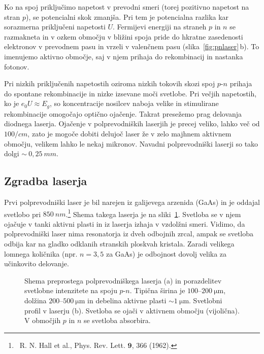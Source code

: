 Ko na spoj priključimo napetost v prevodni smeri (torej pozitivno napetost na stran
$p$), se potencialni skok zmanjša. Pri tem je potencialna razlika kar sorazmerna priključeni
napetosti $U$. Fermijevi energiji na straneh $p$ in $n$ se razmakneta in v
ozkem območju v bližini spoja pride do hkratne zasedenosti elektronov
v prevodnem pasu in vrzeli v valenčnem pasu (slika~\ref{fig:pnlaser}\,b). 
To imenujemo aktivno območje, saj v njem prihaja do rekombinacij in
nastanka fotonov. 

Pri nizkih 
priključenih napetostih oziroma nizkih tokovih skozi spoj $p$-$n$ prihaja
do spontane rekombinacije in nizke izsevane moči svetlobe. 
Pri večjih napetostih, ko je $e_0U \approx E_g$, so koncentracije nosilcev naboja velike in
stimulirane rekombinacije omogočajo optično ojačenje. Takrat presežemo prag delovanja
diodnega laserja. 
Ojačenje v polprevodniških laserjih je precej veliko, lahko več od 
$100/\si{cm}$, zato je mogoče dobiti delujoč laser že v zelo majhnem aktivnem 
območju, velikem lahko le nekaj mikronov. Navadni polprevodniški laserji so tako 
dolgi $\sim~0,25~\si{mm}$.
\newpage

\subsection*{Zgradba laserja}
Prvi polprevodniški laser je bil narejen iz galijevega arzenida (GaAs) in je oddajal svetlobo 
pri $850~\si{nm}$.\footnote{~R. N. Hall 
et al., Phys. Rev. Lett. $\mathbf{9}$, 366 (1962).} 
Shema takega laserja je na sliki~\ref{fig:pnshema}. Svetloba se v njem ojačuje
v tanki aktivni plasti in iz laserja izhaja v vzdolžni smeri. 
Vidimo, da polprevodniški laser nima resonatorja iz dveh odbojnih zrcal,
ampak se svetloba odbija kar na gladko odklanih stranskih ploskvah kristala. Zaradi
velikega lomnega količnika (npr. $n=3,5$ za GaAs) je odbojnost dovolj velika
za učinkovito delovanje.
\begin{figure}[ht]
\centering
\def\svgwidth{120truemm} 

\caption{Shema preprostega polprevodniškega laserja (a) in porazdelitev svetlobne
intenzitete na spoju $p$-$n$. Tipična širina je $100$--$200~\si{\micro\metre}$, 
dolžina $200$--$500~\si{\micro\metre}$ in debelina aktivne plasti  $\sim 1~\si{\micro\metre}$. 
Svetlobni profil v laserju (b). Svetloba 
se ojači v aktivnem območju (vijolična). V območjih $p$ in $n$ se svetloba absorbira.
}
\label{fig:pnshema}
\end{figure}

